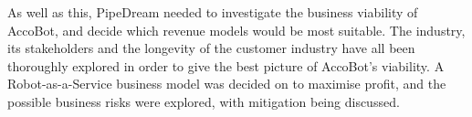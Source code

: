 \documentclass[11pt]{article}		%
\newcommand{\supercite}[1]{\textsuperscript{\cite{#1}}}		%
\begin{document}
        As well as this, PipeDream needed to investigate the business viability of AccoBot, and decide which revenue models would be most suitable.
        The industry, its stakeholders and the longevity of the customer industry have all been thoroughly explored in order to give the best picture of AccoBot's viability.
        A Robot-as-a-Service business model was decided on to maximise profit, and the possible business risks were explored, with mitigation being discussed.

	\pagebreak		%
	
	
	
	
	\begin{multicols}{2}
		\begingroup\onehalfspacing
			{\tiny
				
				
			}
		\endgroup
	\end{multicols}
	
\end{document}
